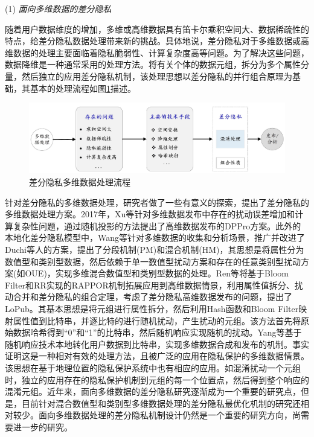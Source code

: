 (1) {\em 面向多维数据的差分隐私}

随着用户数据维度的增加，多维或高维数据具有笛卡尔乘积空间大、数据稀疏性的特点，给差分隐私数据处理带来新的挑战。具体地说，差分隐私对于多维数据或高维数据的处理主要面临着隐私脆弱性、计算复杂度高等问题。为了解决这些问题，数据降维是一种通常采用的处理方法。将有关个体的数据元组，拆分为多个属性分量，然后独立的应用差分隐私机制，该处理思想以差分隐私的并行组合原理\cite{dwork2014algorithmic}为基础，其基本的处理流程如图\ref{fig:chapter02-multidimension-data}描述。

\begin{figure}[htbp]
	\centering
	\includegraphics[width = 0.85\linewidth]{./figures/chapter02_4.jpg}
	\caption{差分隐私多维数据处理流程}
	\label{fig:chapter02-multidimension-data}
\end{figure}

针对差分隐私的多维数据处理，研究者做了一些有意义的探索，提出了差分隐私的多维数据处理方案。2017年，Xu等\cite{xu2017dppro}针对多维数据发布中存在的扰动误差增加和计算复杂性问题，通过随机投影的方法提出了高维数据发布的DPPro方案。此外的本地化差分隐私模型中，Wang等\cite{wang2019collecting}针对多维数据的收集和分析场景，推广并改进了Duchi等人\cite{duchi2018minimax}的方案，提出了分段机制(PM)和混合机制(HM)，其思想是将属性分为数值型和类别型数据，然后依赖于单一数值型扰动方案和存在的任意类别型扰动方案(如OUE\cite{wang2017locally})，实现多维混合数值型和类别型数据的处理。Ren等\cite{ren2018textsf}将基于Bloom Filter和RR实现的RAPPOR机制拓展应用到高维数据情景，利用属性值拆分、扰动合并和差分隐私的组合定理\cite{kairouz2017the}，考虑了差分隐私高维数据发布的问题，提出了LoPub。其基本思想是将元组进行属性拆分，然后利用Hash函数和Bloom Filter映射属性值到比特串，并逐比特的进行随机扰动，产生扰动的元组。该方法首先将原始数据哈希得到``0''和``1''的比特串，然后随机响应实现随机的扰动。Yang等\cite{yang2017copula}基于随机响应技术本地转化用户数据到比特串，实现多维数据合成和发布的机制。事实证明这是一种相对有效的处理方法，且被广泛的应用在隐私保护的多维数据情景。该思想在基于地理位置的隐私保护系统中也有相应的应用。如混淆扰动一个元组时，独立的应用存在的隐私保护机制到元组的每一个位置点，然后得到整个响应的混淆元组\cite{andres2013geo}。近年来，面向多维数据的差分隐私研究逐渐成为一个重要的研究点，但是，目前针对混合数值型和类别型多维数据处理的差分隐私最优化机制的研究还相对较少。面向多维数据处理的差分隐私机制设计仍然是一个重要的研究方向，尚需要进一步的研究。


